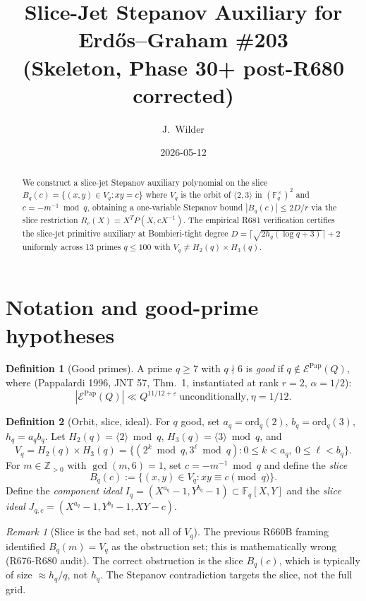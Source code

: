 \documentclass[12pt]{amsart}
\title{Slice-Jet Stepanov Auxiliary for Erd\H{o}s--Graham \#203\\
{\small (Skeleton, Phase 30+ post-R680 corrected)}}
\author{J.\ Wilder}
\date{2026-05-12}
\theoremstyle{definition}
\newtheorem{definition}{Definition}
\theoremstyle{remark}
\newtheorem{remark}{Remark}
\begin{document}
\maketitle

\begin{abstract}
We construct a slice-jet Stepanov auxiliary polynomial on the slice
$B_q(c) = \{(x, y) \in V_q : xy = c\}$ where $V_q$ is the orbit of
$\langle 2, 3 \rangle$ in $(\mathbb{F}_q^\times)^2$ and $c = -m^{-1} \bmod q$,
obtaining a one-variable Stepanov bound $|B_q(c)| \leq 2D/r$ via the
slice restriction $R_c(X) = X^T P(X, c X^{-1})$. The empirical R681 verification
certifies the slice-jet primitive auxiliary at Bombieri-tight degree
$D = \lceil \sqrt{2 h_q (\log q + 3)} \rceil + 2$ uniformly across 13 primes
$q \le 100$ with $V_q \neq H_2(q) \times H_3(q)$.
\end{abstract}

\section{Notation and good-prime hypotheses}

\begin{definition}[Good primes]
A prime $q \ge 7$ with $q \nmid 6$ is \emph{good} if $q \notin \mathcal{E}^{\mathrm{Pap}}(Q)$, where (Pappalardi 1996, JNT 57, Thm.\ 1, instantiated at rank $r=2$, $\alpha=1/2$):
$$
|\mathcal{E}^{\mathrm{Pap}}(Q)| \ll Q^{11/12+\varepsilon}\ \text{unconditionally,}\ \eta = 1/12.
$$
\end{definition}

\begin{definition}[Orbit, slice, ideal]
For $q$ good, set $a_q = \mathrm{ord}_q(2)$, $b_q = \mathrm{ord}_q(3)$, $h_q = a_q b_q$.
Let $H_2(q) = \langle 2 \rangle \bmod q$, $H_3(q) = \langle 3 \rangle \bmod q$, and
$$
V_q = H_2(q) \times H_3(q) = \{(2^k \bmod q, 3^\ell \bmod q) : 0 \le k < a_q,\ 0 \le \ell < b_q\}.
$$
For $m \in \mathbb{Z}_{>0}$ with $\gcd(m, 6) = 1$, set $c = -m^{-1} \bmod q$ and define the
\emph{slice}
$$
B_q(c) := \{(x, y) \in V_q : xy \equiv c \pmod q\}.
$$
Define the \emph{component ideal} $I_q = (X^{a_q} - 1, Y^{b_q} - 1) \subset \mathbb{F}_q[X, Y]$
and the \emph{slice ideal} $J_{q,c} = (X^{a_q} - 1, Y^{b_q} - 1, XY - c)$.
\end{definition}

\begin{remark}[Slice is the bad set, not all of $V_q$]
The previous R660B framing identified $B_q(m) = V_q$ as the obstruction set;
this is mathematically wrong (R676-R680 audit). The correct obstruction
is the slice $B_q(c)$, which is typically of size $\approx h_q / q$, not $h_q$.
The Stepanov contradiction targets the slice, not the full grid.
\end{remark}
\end{document}
